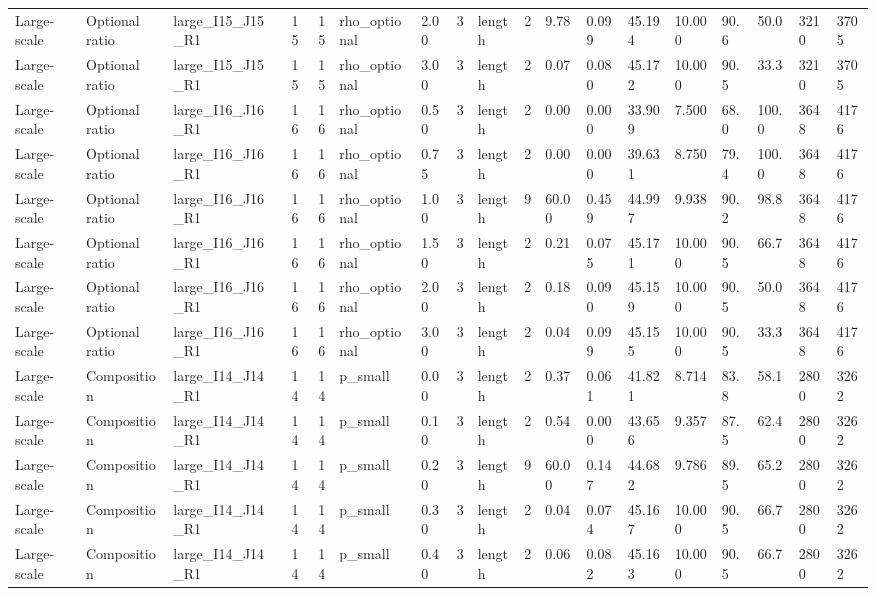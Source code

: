 \begin{longtable}{lllrrllllrllllllll}
Large-scale & Optional ratio & large\_I15\_J15\_R1 & 15 & 15 & rho\_optional & 2.00 & 3 & length & 2 & 9.78 & 0.099 & 45.194 & 10.000 & 90.6 & 50.0 & 3210 & 3705 \\
Large-scale & Optional ratio & large\_I15\_J15\_R1 & 15 & 15 & rho\_optional & 3.00 & 3 & length & 2 & 0.07 & 0.080 & 45.172 & 10.000 & 90.5 & 33.3 & 3210 & 3705 \\
Large-scale & Optional ratio & large\_I16\_J16\_R1 & 16 & 16 & rho\_optional & 0.50 & 3 & length & 2 & 0.00 & 0.000 & 33.909 & 7.500 & 68.0 & 100.0 & 3648 & 4176 \\
Large-scale & Optional ratio & large\_I16\_J16\_R1 & 16 & 16 & rho\_optional & 0.75 & 3 & length & 2 & 0.00 & 0.000 & 39.631 & 8.750 & 79.4 & 100.0 & 3648 & 4176 \\
Large-scale & Optional ratio & large\_I16\_J16\_R1 & 16 & 16 & rho\_optional & 1.00 & 3 & length & 9 & 60.00 & 0.459 & 44.997 & 9.938 & 90.2 & 98.8 & 3648 & 4176 \\
Large-scale & Optional ratio & large\_I16\_J16\_R1 & 16 & 16 & rho\_optional & 1.50 & 3 & length & 2 & 0.21 & 0.075 & 45.171 & 10.000 & 90.5 & 66.7 & 3648 & 4176 \\
Large-scale & Optional ratio & large\_I16\_J16\_R1 & 16 & 16 & rho\_optional & 2.00 & 3 & length & 2 & 0.18 & 0.090 & 45.159 & 10.000 & 90.5 & 50.0 & 3648 & 4176 \\
Large-scale & Optional ratio & large\_I16\_J16\_R1 & 16 & 16 & rho\_optional & 3.00 & 3 & length & 2 & 0.04 & 0.099 & 45.155 & 10.000 & 90.5 & 33.3 & 3648 & 4176 \\
Large-scale & Composition & large\_I14\_J14\_R1 & 14 & 14 & p\_small & 0.00 & 3 & length & 2 & 0.37 & 0.061 & 41.821 & 8.714 & 83.8 & 58.1 & 2800 & 3262 \\
Large-scale & Composition & large\_I14\_J14\_R1 & 14 & 14 & p\_small & 0.10 & 3 & length & 2 & 0.54 & 0.000 & 43.656 & 9.357 & 87.5 & 62.4 & 2800 & 3262 \\
Large-scale & Composition & large\_I14\_J14\_R1 & 14 & 14 & p\_small & 0.20 & 3 & length & 9 & 60.00 & 0.147 & 44.682 & 9.786 & 89.5 & 65.2 & 2800 & 3262 \\
Large-scale & Composition & large\_I14\_J14\_R1 & 14 & 14 & p\_small & 0.30 & 3 & length & 2 & 0.04 & 0.074 & 45.167 & 10.000 & 90.5 & 66.7 & 2800 & 3262 \\
Large-scale & Composition & large\_I14\_J14\_R1 & 14 & 14 & p\_small & 0.40 & 3 & length & 2 & 0.06 & 0.082 & 45.163 & 10.000 & 90.5 & 66.7 & 2800 & 3262 \\

\end{longtable}
